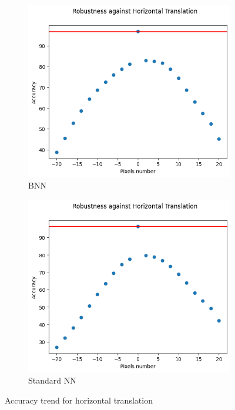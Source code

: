 \begin{figure}[h]
	\centering
	\begin{subfigure}{.5\textwidth}
		\centering
		\includegraphics[width=0.9\linewidth]{ImageFiles/EvalBNN/HT/WU/acc}
		\caption{BNN}
		\label{fig:ht_acc_wu_bnn}
	\end{subfigure}%
	\begin{subfigure}{.5\textwidth}
		\centering
		\includegraphics[width=0.9\linewidth]{ImageFiles/EvalANN/horiz_trans_ann}
		\caption{Standard NN}
		\label{fig:horiz_trans_ann}
	\end{subfigure}
	\caption{Accuracy trend for horizontal translation}
	\label{fig:acc_ht_wu}
\end{figure}

